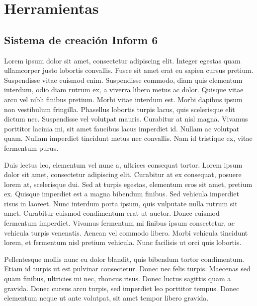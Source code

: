 
\chapter{Herramientas}

\section{Sistema de creación Inform 6}

Lorem ipsum dolor sit amet\cite{Stanley1970}, consectetur adipiscing elit. Integer egestas quam ullamcorper justo lobortis convallis. Fusce sit amet erat eu sapien cursus pretium. Suspendisse vitae euismod enim. Suspendisse commodo, diam quis elementum interdum, odio diam rutrum ex, a viverra libero metus ac dolor. Quisque vitae arcu vel nibh finibus pretium. Morbi vitae interdum est. Morbi dapibus ipsum non vestibulum fringilla. Phasellus lobortis turpis lacus, quis scelerisque elit dictum nec. Suspendisse vel volutpat mauris. Curabitur at nisl magna. Vivamus porttitor lacinia mi, sit amet faucibus lacus imperdiet id. Nullam ac volutpat quam. Nullam imperdiet tincidunt metus nec convallis. Nam id tristique ex, vitae fermentum purus.

Duis lectus leo, elementum vel nunc a, ultrices consequat tortor. Lorem ipsum dolor sit amet, consectetur adipiscing elit. Curabitur at ex consequat, posuere lorem at, scelerisque dui. Sed at turpis egestas, elementum eros sit amet, pretium ex. Quisque imperdiet est a magna bibendum finibus. Sed vehicula imperdiet risus in laoreet. Nunc interdum porta ipsum, quis vulputate nulla rutrum sit amet. Curabitur euismod condimentum erat ut auctor. Donec euismod fermentum imperdiet. Vivamus fermentum mi finibus ipsum consectetur, ac vehicula turpis venenatis. Aenean vel commodo libero. Morbi vehicula tincidunt lorem, et fermentum nisl pretium vehicula. Nunc facilisis ut orci quis lobortis.

Pellentesque mollis nunc eu dolor blandit, quis bibendum tortor condimentum. Etiam id turpis ut est pulvinar consectetur. Donec nec felis turpis. Maecenas sed quam finibus, ultricies mi nec, rhoncus risus. Donec luctus sagittis quam a gravida. Donec cursus arcu turpis, sed imperdiet leo porttitor tempus. Donec elementum neque ut ante volutpat, sit amet tempor libero gravida.


